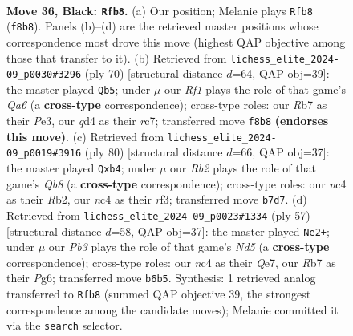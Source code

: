 \documentclass[11pt]{article}
\begin{document}
\clearpage

\begin{figure}[p]\centering
\begin{subfigure}{0.46\textwidth}\centering
\resizebox{\linewidth}{!}{%
\newchessgame
\chessboard[
  setfen={5rk1/1r5p/1p6/p7/2NQ3P/8/PP3PP1/R4K2 b - - 10 36},
  showmover=false,
  pgfstyle=straightmove, color=movearrow, markmove={f8-b8}
]}
\caption{}
\end{subfigure}\hfill
\begin{subfigure}{0.46\textwidth}\centering
\resizebox{\linewidth}{!}{%
\newchessgame
\chessboard[
  setfen={8/2rnqk1p/Q4pp1/4p3/2P5/4P2P/2P2R2/5R1K w - - 1 36},
  showmover=false,
  pgfstyle=straightmove, color=movearrow, markmove={a6-b5}
]}
\caption{}
\end{subfigure}
\\[4pt]
\begin{subfigure}{0.46\textwidth}\centering
\resizebox{\linewidth}{!}{%
\newchessgame
\chessboard[
  setfen={1Q6/5bpk/7p/8/1p4q1/4prP1/PR5P/2R3K1 w - - 2 41},
  showmover=false,
  pgfstyle=straightmove, color=movearrow, markmove={b8-b4}
]}
\caption{}
\end{subfigure}\hfill
\begin{subfigure}{0.46\textwidth}\centering
\resizebox{\linewidth}{!}{%
\newchessgame
\chessboard[
  setfen={r5k1/4qp1p/6p1/8/P2n4/8/5PPP/R2QN1K1 b - - 2 29},
  showmover=false,
  pgfstyle=straightmove, color=movearrow, markmove={d4-e2}
]}
\caption{}
\end{subfigure}
\caption{\textbf{Move 36, Black: \texttt{Rfb8}.} (a) Our position; Melanie plays \texttt{Rfb8} (\texttt{f8b8}). Panels (b)--(d) are the retrieved master positions whose correspondence most drove this move (highest QAP objective among those that transfer to it). (b) Retrieved from \texttt{lichess\_elite\_2024-09\_p0030\#3296} (ply 70) [structural distance $d$=64, QAP obj=39]: the master played \texttt{Qb5}; under $\mu$ our \emph{Rf1} plays the role of that game's \emph{Qa6} (a \textbf{cross-type} correspondence); cross-type roles: our \emph{R}b7 as their \emph{P}e3, our \emph{q}d4 as their \emph{r}c7; transferred move \texttt{f8b8} \textbf{(endorses this move)}. (c) Retrieved from \texttt{lichess\_elite\_2024-09\_p0019\#3916} (ply 80) [structural distance $d$=66, QAP obj=37]: the master played \texttt{Qxb4}; under $\mu$ our \emph{Rb2} plays the role of that game's \emph{Qb8} (a \textbf{cross-type} correspondence); cross-type roles: our \emph{n}c4 as their \emph{R}b2, our \emph{n}c4 as their \emph{r}f3; transferred move \texttt{b7d7}. (d) Retrieved from \texttt{lichess\_elite\_2024-09\_p0023\#1334} (ply 57) [structural distance $d$=58, QAP obj=37]: the master played \texttt{Ne2+}; under $\mu$ our \emph{Pb3} plays the role of that game's \emph{Nd5} (a \textbf{cross-type} correspondence); cross-type roles: our \emph{n}c4 as their \emph{Q}e7, our \emph{R}b7 as their \emph{P}g6; transferred move \texttt{b6b5}. Synthesis: 1 retrieved analog transferred to \texttt{Rfb8} (summed QAP objective 39, the strongest correspondence among the candidate moves); Melanie committed it via the \texttt{search} selector.}
\label{fig:thought-m71}
\end{figure}
\end{document}
